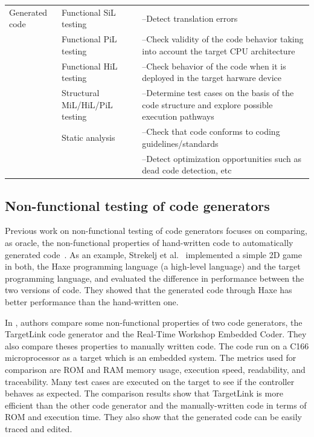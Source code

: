 \begin{table}[H]
{\begin{tabular}{| p{} | p{} |p{} |}
			Generated code 
			& Functional SiL testing & --Detect translation errors \\
			\cline{2-3}
			& Functional PiL testing & --Check validity of the code behavior taking into account the target CPU architecture \\
			\cline{2-3}
			& Functional HiL testing & --Check behavior of the code when it is deployed in the target harware device \\
			\cline{2-3}
			& Structural MiL/HiL/PiL testing & --Determine test cases on the basis of the code structure and explore possible execution pathways \\
			\cline{2-3}
			& Static analysis & --Check that code conforms to coding guidelines/standards\\
			&& --Detect optimization opportunities such as dead code detection, etc \\
			\hline
		\end{tabular}}
		\label{tab:targetlink}
	\end{table}
 


\subsection{Non-functional testing of code generators}
\label{sec:Non-functional testing of code generators}
Previous work on non-functional testing of code generators focuses on comparing, as oracle, the non-functional properties of hand-written code to automatically generated code~\cite{stepasyuk2015evaluating,richard2013efficient}. As an example, Strekelj et al.~\cite{vstrekelj2015performance} implemented a simple 2D game in both, the Haxe programming language (a high-level language) and the target programming language, and evaluated the difference in performance between the two versions of code. They showed that the generated code through Haxe has better performance than the hand-written one. 

In \cite{ajwad2007evaluation}, authors compare some non-functional properties of two code generators, the TargetLink code generator and the Real-Time Workshop Embedded Coder. They also compare theses properties to manually written code. The code run on a C166 microprocessor as a target which is an embedded system.
The metrics used for comparison are ROM and RAM memory usage, execution speed, readability, and traceability. Many test cases are executed on the target to see if the controller behaves as expected.
The comparison results show that TargetLink is more efficient than the other code generator and the manually-written code in terms of ROM and execution time. They also show that the generated code can be easily traced and edited.

